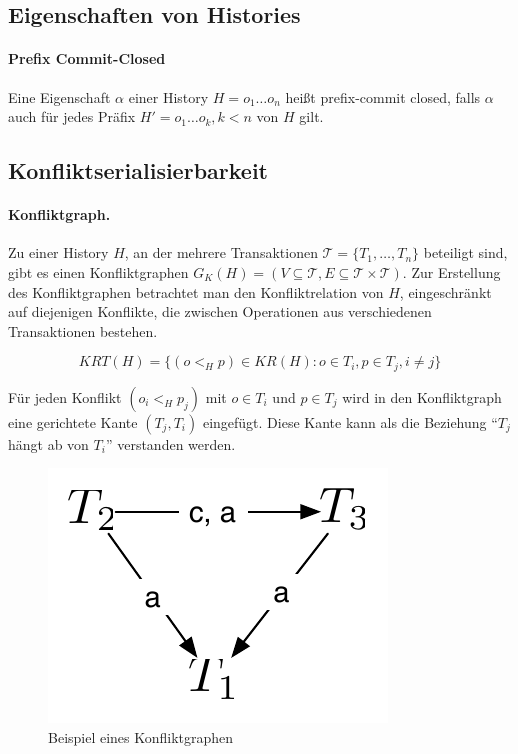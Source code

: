 \documentclass[]{scrartcl}
\begin{document}
\subsection{Eigenschaften von Histories}

\paragraph{Prefix Commit-Closed} Eine Eigenschaft $\alpha$ einer History $H = o_{1} \dots o_{n}$ hei{\ss}t prefix-commit closed, falls $\alpha$ auch f\"ur jedes Pr\"afix $H' = o_{1} \dots o_{k}, k < n$ von $H$ gilt.

\subsection{Konfliktserialisierbarkeit}

\paragraph{Konfliktgraph.}

Zu einer History $H$, an der mehrere Transaktionen $\mathcal{T} = \{ T_{1}, \dots, T_{n}\}$ beteiligt sind, gibt es einen Konfliktgraphen $G_{K}(H) = (V \subseteq \mathcal{T}, E \subseteq \mathcal{T} \times \mathcal{T})$.
Zur Erstellung des Konfliktgraphen betrachtet man den Konfliktrelation von $H$, eingeschr\"ankt auf diejenigen Konflikte, die zwischen Operationen aus verschiedenen Transaktionen bestehen.

$$KRT(H) = \{ (o <_{H} p ) \in KR(H) : o \in T_{i}, p \in T_{j}, i \neq j\}$$

F\"ur jeden Konflikt $(o_{i} <_{H} p_{j} )$ mit $o \in T_{i}$ und $p \in T_{j}$ wird in den Konfliktgraph eine gerichtete Kante $(T_{j},T_{i})$ eingef\"ugt. Diese Kante kann als die Beziehung ``$T_{j}$ h\"angt ab von $T_{i}$'' verstanden werden.

\begin{figure}[H]
\begin{center}
\includegraphics[scale=0.6]{figures/konfliktgraph.pdf}
\caption{Beispiel eines Konfliktgraphen}
\label{default}
\end{center}
\end{figure}
\end{document}
